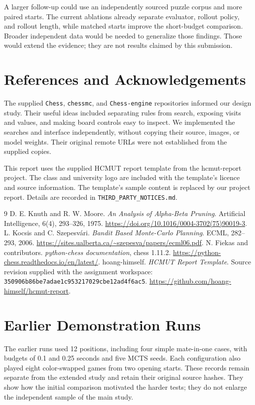 \documentclass[oneside,final]{hcmut-report}
\begin{document}
A larger follow-up could use an independently sourced puzzle corpus and
more paired starts. The current ablations already separate evaluator,
rollout policy, and rollout length, while matched starts improve the short-budget
comparison. Broader independent data would be needed to generalize those findings. Those would extend the evidence;
they are not results claimed by this submission.

\section*{References and Acknowledgements}
The supplied \texttt{Chess}, \texttt{chessmc}, and \texttt{Chess-engine}
repositories informed our design study. Their useful ideas included
separating rules from search, exposing visits and values, and making board
controls easy to inspect. We implemented the searches and interface
independently, without copying their source, images, or model weights.
Their original remote URLs were not established from the supplied copies.

This report uses the supplied HCMUT report template from the hcmut-report project. The
class and university logo are included with the template's licence and
source information. The template's sample content is replaced by our project
report. Details are recorded in \texttt{THIRD\_PARTY\_NOTICES.md}.
\begin{thebibliography}{9}
 D. E. Knuth and R. W. Moore.
\emph{An Analysis of Alpha-Beta Pruning}. Artificial Intelligence, 6(4),
293--326, 1975. \url{https://doi.org/10.1016/0004-3702(75)90019-3}.
 L. Kocsis and C. Szepesv\'ari.
\emph{Bandit Based Monte-Carlo Planning}. ECML, 282--293, 2006.
\url{https://sites.ualberta.ca/~szepesva/papers/ecml06.pdf}.
 N. Fiekas and contributors.
\emph{python-chess documentation}, chess 1.11.2.
\url{https://python-chess.readthedocs.io/en/latest/}.
 hoang-himself.
\emph{HCMUT Report Template}. Source revision supplied with the assignment
workspace: \texttt{350906b86be7adae1c953217029cbe12ad4f6ac5}.
\url{https://github.com/hoang-himself/hcmut-report}.
\end{thebibliography}

\appendix
\section{Earlier Demonstration Runs}
\label{app:earlier}
The earlier runs used 12 positions, including four simple mate-in-one cases,
with budgets of 0.1 and 0.25 seconds and five MCTS seeds. Each configuration
also played eight color-swapped games from two opening starts. These records
remain separate from the extended study and retain their original source
hashes. They show how the initial comparison motivated the harder tests;
they do not enlarge the independent sample of the main study.
\end{document}
